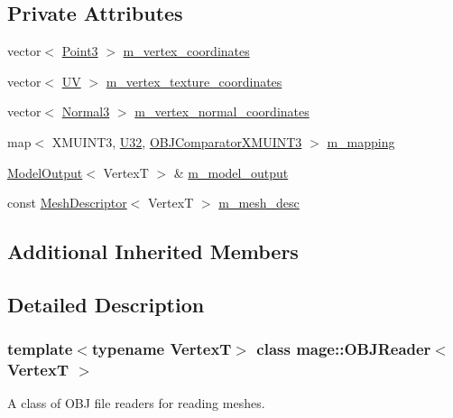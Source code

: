 \subsection*{Private Attributes}
\begin{DoxyCompactItemize}
\item 
vector$<$ \hyperlink{structmage_1_1_point3}{Point3} $>$ \hyperlink{classmage_1_1_o_b_j_reader_a1032eb4a6844a99f1d96fc17c3e52aee}{m\+\_\+vertex\+\_\+coordinates}
\item 
vector$<$ \hyperlink{structmage_1_1_u_v}{UV} $>$ \hyperlink{classmage_1_1_o_b_j_reader_aec7c093d380be0b8506f7b8fdf9c3ad1}{m\+\_\+vertex\+\_\+texture\+\_\+coordinates}
\item 
vector$<$ \hyperlink{structmage_1_1_normal3}{Normal3} $>$ \hyperlink{classmage_1_1_o_b_j_reader_a765e87afe7bd138dadcfc8c194311ed3}{m\+\_\+vertex\+\_\+normal\+\_\+coordinates}
\item 
map$<$ X\+M\+U\+I\+N\+T3, \hyperlink{namespacemage_a41c104c036fba3756a74e19f793eeaa1}{U32}, \hyperlink{structmage_1_1_o_b_j_reader_1_1_o_b_j_comparator_x_m_u_i_n_t3}{O\+B\+J\+Comparator\+X\+M\+U\+I\+N\+T3} $>$ \hyperlink{classmage_1_1_o_b_j_reader_a6707a903835506be468fa6a0af29a70b}{m\+\_\+mapping}
\item 
\hyperlink{structmage_1_1_model_output}{Model\+Output}$<$ VertexT $>$ \& \hyperlink{classmage_1_1_o_b_j_reader_ad4691c59a3e3ecefd201a8f03528bbd8}{m\+\_\+model\+\_\+output}
\item 
const \hyperlink{structmage_1_1_mesh_descriptor}{Mesh\+Descriptor}$<$ VertexT $>$ \hyperlink{classmage_1_1_o_b_j_reader_a4b5810a694e2223de437e62bba748bc8}{m\+\_\+mesh\+\_\+desc}
\end{DoxyCompactItemize}
\subsection*{Additional Inherited Members}


\subsection{Detailed Description}
\subsubsection*{template$<$typename VertexT$>$\newline
class mage\+::\+O\+B\+J\+Reader$<$ Vertex\+T $>$}

A class of O\+BJ file readers for reading meshes.


